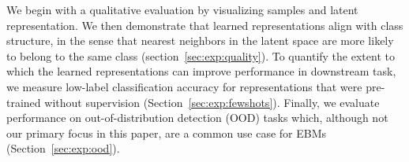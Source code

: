 \documentclass{article}
\begin{document}
We begin with a qualitative evaluation by visualizing samples and latent representation. We then demonstrate that learned representations align with class structure, in the sense that nearest neighbors in the latent space are more likely to belong to the same class (section~\ref{sec:exp:quality}). To quantify the extent to which the learned representations can improve performance in downstream task, we measure low-label classification accuracy for representations that were pre-trained without supervision (Section~\ref{sec:exp:fewshots}). %
Finally, we evaluate performance on out-of-distribution detection (OOD) tasks which, although not our primary focus in this paper, are a common use case for EBMs (Section~\ref{sec:exp:ood}).








\end{document}
